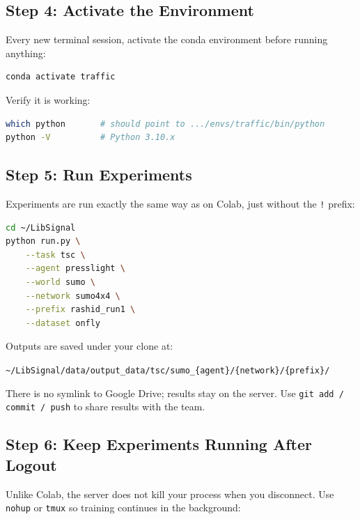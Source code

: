 \documentclass[11pt,a4paper]{article}
\begin{document}
\subsection{Step 4: Activate the Environment}

Every new terminal session, activate the conda environment before running anything:

\begin{lstlisting}[language=bash]
conda activate traffic
\end{lstlisting}

Verify it is working:

\begin{lstlisting}[language=bash]
which python       # should point to .../envs/traffic/bin/python
python -V          # Python 3.10.x
\end{lstlisting}

\subsection{Step 5: Run Experiments}

Experiments are run exactly the same way as on Colab, just without the \texttt{!} prefix:

\begin{lstlisting}[language=bash]
cd ~/LibSignal
python run.py \
    --task tsc \
    --agent presslight \
    --world sumo \
    --network sumo4x4 \
    --prefix rashid_run1 \
    --dataset onfly
\end{lstlisting}

Outputs are saved under your clone at:

\begin{center}
\texttt{\textasciitilde/LibSignal/data/output\_data/tsc/sumo\_\{agent\}/\{network\}/\{prefix\}/}
\end{center}

There is no symlink to Google Drive; results stay on the server.
Use \texttt{git add / commit / push} to share results with the team.

\subsection{Step 6: Keep Experiments Running After Logout}

Unlike Colab, the server does not kill your process when you disconnect.
Use \texttt{nohup} or \texttt{tmux} so training continues in the background:
\end{document}
